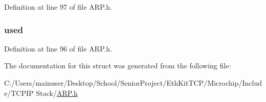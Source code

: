 Definition at line 97 of file A\+R\+P.\+h.

\hypertarget{structarp__app__callbacks_ab0db8fd79ec3224678ed5cae0428d292}{}
\subsubsection[{used}]{ used}\label{structarp__app__callbacks_ab0db8fd79ec3224678ed5cae0428d292}


Definition at line 96 of file A\+R\+P.\+h.



The documentation for this struct was generated from the following file\+:\begin{DoxyCompactItemize}
\item 
C\+:/\+Users/mainuser/\+Desktop/\+School/\+Senior\+Project/\+Eth\+Kit\+T\+C\+P/\+Microchip/\+Include/\+T\+C\+P\+I\+P Stack/\hyperlink{_a_r_p_8h}{A\+R\+P.\+h}\end{DoxyCompactItemize}
